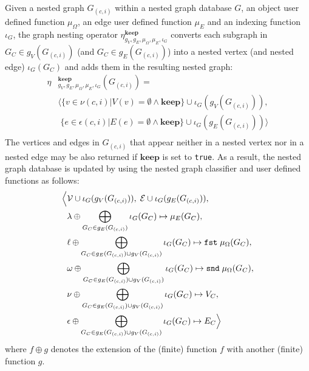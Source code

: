 \begin{definition}
	Given a nested graph $G_{(c,i)}$ within a nested graph database $G$, an object user defined function $\mu_\Omega$, an edge user defined function $\mu_E$ and an indexing function $\iota_G$,
	the graph nesting operator $\eta_{g_V,g_E,\mu_\Omega,\mu_E,\iota_G}^{\textbf{keep}}$ converts each subgraph in $G_C\in g_V(G_{(c,i)})$ (and $G_C\in g_E(G_{(c,i)})$) into a nested vertex (and nested edge) $\iota_G(G_C)$ and adds them in the resulting nested graph:
	\[\begin{split}
	\eta&{}_{g_V,g_E,\mu_\Omega,\mu_E,\iota_G}^{\textbf{keep}}(G_{(c,i)})=\\
	&\big\langle \{v\in \nu(c,i) | V(v)=\emptyset\wedge\textbf{keep} \}\cup \iota_G(g_V(G_{(c,i)})),\\
	&\;\{e\in \epsilon(c,i) | E(e)=\emptyset\wedge\textbf{keep} \}\cup \iota_G(g_E(G_{(c,i)}))\big\rangle\\
	\end{split}\]
	The vertices and edges in $G_{(c,i)}$ that appear neither in a nested vertex nor in a nested edge may be also returned if $\textbf{keep}$ is set to \texttt{true}. As a result, the nested graph database is updated by using the nested graph classifier and user defined functions as follows:
	\[\begin{split}
	\Big\langle&\mathcal{V}\cup \iota_G(g_V(G_{(c,i)})),\;\mathcal{E}\cup \iota_G(g_E(G_{(c,i)})),\\
	& \lambda\oplus \bigoplus_{G_C\in g_E(G_{(c,i)})}\iota_G(G_C)\mapsto \mu_E(G_C),\\
	& \ell\oplus\bigoplus_{G_C\in g_E(G_{(c,i)})\cup g_V(G_{(c,i)})}\iota_G(G_C)\mapsto\texttt{fst}\;\mu_\Omega(G_C),\\
	& \omega\oplus\bigoplus_{G_C\in g_E(G_{(c,i)})\cup g_V(G_{(c,i)})}\iota_G(G_C)\mapsto\texttt{snd}\;\mu_\Omega(G_C),\\
	& \nu\oplus \bigoplus_{G_C\in g_E(G_{(c,i)})\cup g_V(G_{(c,i)})}\iota_G(G_C)\mapsto V_C,\\
	& \epsilon\oplus \bigoplus_{G_C\in g_E(G_{(c,i)})\cup g_V(G_{(c,i)})}\iota_G(G_C)\mapsto E_C\Big\rangle\\
	\end{split}\]
	where $f\oplus g$ denotes the extension of the (finite) function $f$ with another (finite) function $g$.
\end{definition}


